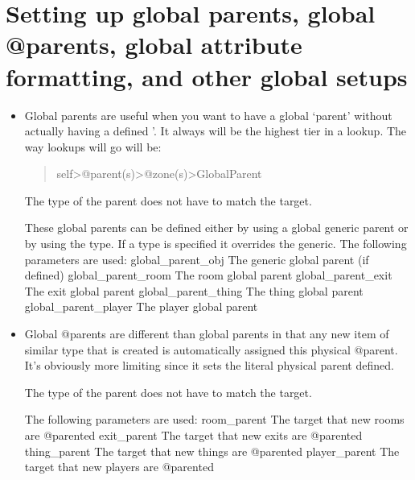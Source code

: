\documentclass[letterpaper,10pt,english]{sphinxmanual}
\begin{document}
\section{Setting up global parents, global @parents, global attribute formatting, and other global setups}
\label{\detokenize{12-advanced:setting-up-global-parents-global-parents-global-attribute-formatting-and-other-global-setups}}\begin{itemize}
\item {} 
\sphinxAtStartPar
Global parents are useful when you want to have a global ‘parent’
without actually having a defined ’.  It always will be the
highest tier in a lookup.  The way lookups will go will be:
\begin{quote}

\sphinxAtStartPar
self\sphinxhyphen{}\textgreater{}@parent(s)\sphinxhyphen{}\textgreater{}@zone(s)\sphinxhyphen{}\textgreater{}GlobalParent
\end{quote}

\sphinxAtStartPar
The type of the parent does not have to match the target.

\sphinxAtStartPar
These global parents can be defined either by using a global
generic parent or by using the type.  If a type is specified it
overrides the generic.  The following parameters are used:
\sphinxhyphen{} global\_parent\_obj     \sphinxhyphen{} The generic global parent (if defined)
\sphinxhyphen{} global\_parent\_room    \sphinxhyphen{} The room global parent
\sphinxhyphen{} global\_parent\_exit    \sphinxhyphen{} The exit global parent
\sphinxhyphen{} global\_parent\_thing   \sphinxhyphen{} The thing global parent
\sphinxhyphen{} global\_parent\_player  \sphinxhyphen{} The player global parent

\item {} 
\sphinxAtStartPar
Global @parents are different than global parents in that any new
item of similar type that is created is automatically assigned this
physical @parent.  It’s obviously more limiting since it sets
the literal physical parent defined.

\sphinxAtStartPar
The type of the parent does not have to match the target.

\sphinxAtStartPar
The following parameters are used:
\sphinxhyphen{} room\_parent           \sphinxhyphen{} The target that new rooms are @parented
\sphinxhyphen{} exit\_parent           \sphinxhyphen{} The target that new exits are @parented
\sphinxhyphen{} thing\_parent          \sphinxhyphen{} The target that new things are @parented
\sphinxhyphen{} player\_parent         \sphinxhyphen{} The target that new players are @parented


\end{itemize}
\end{document}
